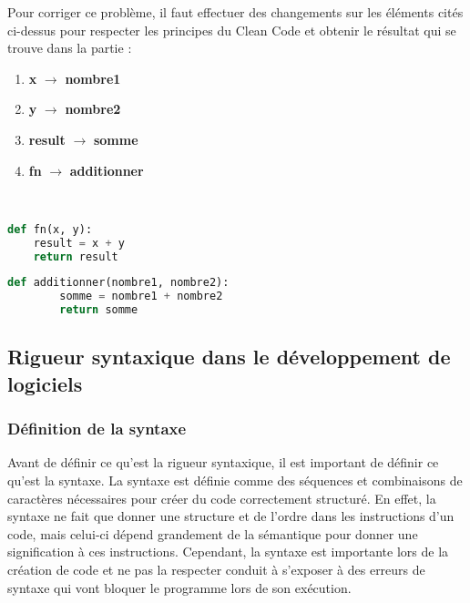 \documentclass{rapport}
\begin{document}
Pour corriger ce problème, il faut effectuer des changements sur les éléments cités ci-dessus pour respecter les principes du Clean Code et obtenir le résultat qui se trouve dans la partie :  
\begin{enumerate}
    \item \textbf{x} $\rightarrow$ \textbf{nombre1}
    \item \textbf{y} $\rightarrow$ \textbf{nombre2}
    \item \textbf{result} $\rightarrow$ \textbf{somme}
    \item \textbf{fn} $\rightarrow$ \textbf{additionner}
\end{enumerate} \\
\begin{minipage}[t]{0.48\linewidth}
    \label{lstlisting:WithoutCleanCode}
    \label{lstlisting:WithCleanCode}
    \begin{lstlisting}[language=python, style = code_style_no_border]
    def fn(x, y):
    result = x + y
    return result
    \end{lstlisting}
\end{minipage}
\hfill\vrule\hfill
\begin{minipage}[t]{0.51\linewidth}
    \begin{lstlisting}[language=python, style = code_style_no_border]
    def additionner(nombre1, nombre2):
        somme = nombre1 + nombre2
        return somme
    \end{lstlisting}
\end{minipage}

\newpage
\subsection{Rigueur syntaxique dans le développement de logiciels}
\subsubsection{Définition de la syntaxe}
\label{subsubsec:defSynt}
Avant de définir ce qu'est la rigueur syntaxique, il est important de définir ce qu'est la syntaxe. La syntaxe est définie comme des séquences et combinaisons de caractères nécessaires pour créer du code correctement structuré. En effet, la syntaxe ne fait que donner une structure et de l'ordre dans les instructions d'un code, mais celui-ci dépend grandement de la sémantique pour donner une signification à ces instructions. Cependant, la syntaxe est importante lors de la création de code et ne pas la respecter conduit à s'exposer à des erreurs de syntaxe qui vont bloquer le programme lors de son exécution.
\end{document}
